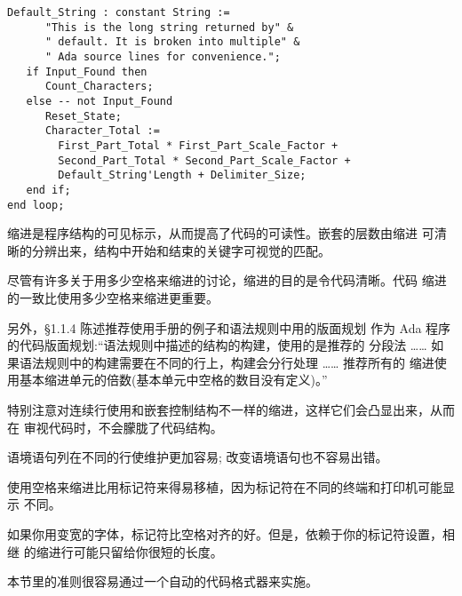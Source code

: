 \begin{blockindent}
\noindent
\begin{verbatim}
Default_String : constant String :=
      "This is the long string returned by" &
      " default. It is broken into multiple" &
      " Ada source lines for convenience.";
   if Input_Found then
      Count_Characters;
   else -- not Input_Found
      Reset_State;
      Character_Total :=
        First_Part_Total * First_Part_Scale_Factor +
        Second_Part_Total * Second_Part_Scale_Factor +
        Default_String'Length + Delimiter_Size;
   end if;
end loop;
\end{verbatim}
\end{blockindent}

\begin{blockindent}
缩进是程序结构的可见标示，从而提高了代码的可读性。嵌套的层数由缩进
可清晰的分辨出来，结构中开始和结束的关键字可视觉的匹配。

尽管有许多关于用多少空格来缩进的讨论，缩进的目的是令代码清晰。代码
缩进的一致比使用多少空格来缩进更重要。

另外，\cite{ARM95}\S{}1.1.4 陈述推荐使用手册的例子和语法规则中用的版面规划
作为 Ada 程序的代码版面规划:``语法规则中描述的结构的构建，使用的是推荐的
分段法 …… 如果语法规则中的构建需要在不同的行上，构建会分行处理 …… 推荐所有的
缩进使用基本缩进单元的倍数(基本单元中空格的数目没有定义)。''

特别注意对连续行使用和嵌套控制结构不一样的缩进，这样它们会凸显出来，从而在
审视代码时，不会朦胧了代码结构。

语境语句列在不同的行使维护更加容易; 改变语境语句也不容易出错。

使用空格来缩进比用标记符来得易移植，因为标记符在不同的终端和打印机可能显示
不同。
\end{blockindent}

\begin{blockindent}
如果你用变宽的字体，标记符比空格对齐的好。但是，依赖于你的标记符设置，相继
的缩进行可能只留给你很短的长度。
\end{blockindent}

\begin{blockindent}
本节里的准则很容易通过一个自动的代码格式器来实施。
\end{blockindent}

